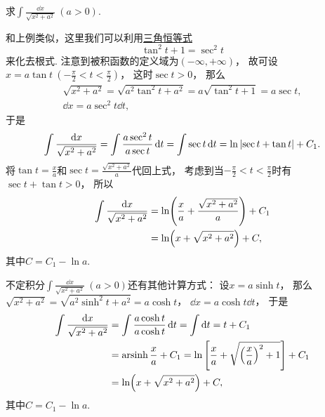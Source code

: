 \begin{example}
求\(\int \frac{\dd{x}}{\sqrt{x^2 + a^2}}\ (a>0)\).
\begin{solution}
和上例类似，这里我们可以利用\hyperref[equation:三角函数.毕达哥拉斯三角恒等式2]{三角恒等式}\begin{equation*}
	\tan^2 t + 1 = \sec^2 t
\end{equation*}来化去根式.
注意到被积函数的定义域为\((-\infty,+\infty)\)，
故可设\(x = a \tan t\ (-\frac\pi2 < t < \frac\pi2)\)，
这时\(\sec t > 0\)，
那么\begin{gather*}
	\sqrt{x^2 + a^2}
	= \sqrt{a^2 \tan^2 t + a^2}
	= a \sqrt{\tan^2 t + 1}
	= a \sec t, \\
	\dd{x} = a \sec^2 t \dd{t},
\end{gather*}
于是\begin{equation*}
	\int \frac{\dd{x}}{\sqrt{x^2 + a^2}}
	= \int \frac{a \sec^2 t}{a \sec t} \dd{t}
	= \int \sec t \dd{t}
	= \ln\abs{\sec t + \tan t} + C_1.
\end{equation*}
将\(\tan t = \frac{x}{a}\)和\(\sec t = \frac{\sqrt{x^2+a^2}}{a}\)代回上式，
考虑到当\(-\frac\pi2 < t < \frac\pi2\)时有\(\sec t + \tan t > 0\)，
所以\begin{align}
	\int \frac{\dd{x}}{\sqrt{x^2 + a^2}}
	&= \ln( \frac{x}{a} + \frac{\sqrt{x^2 + a^2}}{a} ) + C_1 \notag \\
	&= \ln(x + \sqrt{x^2 + a^2}) + C,
\end{align}
其中\(C = C_1 - \ln a\).
\end{solution}
\end{example}
\begin{remark}
不定积分\(\int \frac{\dd{x}}{\sqrt{x^2 + a^2}}\ (a>0)\)还有其他计算方式：
设\(x = a \sinh t\)，
那么\(\sqrt{x^2+a^2}
=\sqrt{a^2\sinh^2t+a^2}
=a\cosh t\)，
\(\dd{x}=a\cosh t\dd{t}\)，
于是\begin{align*}
	\int\frac{\dd{x}}{\sqrt{x^2+a^2}}
	&= \int\frac{a\cosh t}{a\cosh t}\dd{t}
	= \int\dd{t}
	= t+C_1 \\
	&= \operatorname{arsinh}\frac{x}{a} + C_1
	= \ln\left[\frac{x}{a}+\sqrt{\left(\frac{x}{a}\right)^2+1}\right] + C_1 \\
	&= \ln(x+\sqrt{x^2+a^2})+C,
\end{align*}
其中\(C=C_1-\ln a\).
\end{remark}


